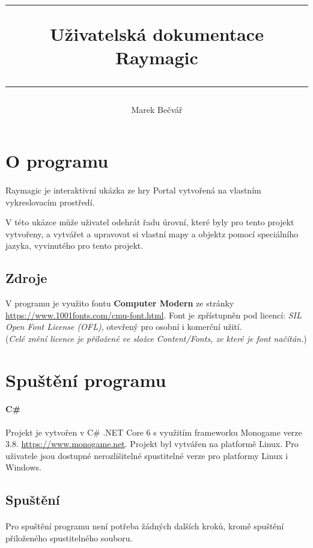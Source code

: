 \documentclass[a4paper, 12pt]{article}
\title{
        \vspace{1in}
        \rule{\linewidth}{0.5pt}
		\usefont{OT1}{bch}{b}{n}
        \huge Uživatelská dokumentace \\Raymagic\\
        \vspace{-10pt}
        \rule{\linewidth}{1pt}
}
\author{
		\normalfont\normalsize
        Marek Bečvář\\[-3pt]
}
\date{}
\begin{document}
\maketitle 
\newpage

\tableofcontents
\newpage

\section{O programu} 
\paragraph{}
Raymagic je interaktivní ukázka ze hry Portal vytvořená na vlastním
vykreslovacím prostředí. 

V této ukázce může uživatel odehrát řadu úrovní, 
které byly pro tento projekt vytvořeny, a vytvářet a upravovat si vlastní mapy a objektz pomocí speciálního
jazyka, vyvinutého pro tento projekt. 

\subsection{Zdroje}
V programu je využito fontu \textbf{Computer Modern} ze stránky\\
\url{https://www.1001fonts.com/cmu-font.html}. 
Font je zpřístupněn pod licencí: \emph{SIL Open Font License (OFL)}, otevřený
pro osobní i komerční užití. \\\small{(\emph{Celé znění licence je přiložené ve
složce Content/Fonts, ze které je font načítán.})}


\section{Spuštění programu}
\paragraph{C\#}
Projekt je vytvořen v C\# .NET Core 6 s využitím frameworku Monogame verze 3.8.
\url{https://www.monogame.net}. Projekt byl vytvářen na platformě Linux. Pro
uživatele jsou dostupné nerozlišitelné spustitelné verze pro platformy Linux i
Windows.

\subsection{Spuštění}
\paragraph{}
Pro spuštění programu není potřeba žádných dalších kroků, kromě spuštění
přiloženého spustitelného souboru.
\end{document}
